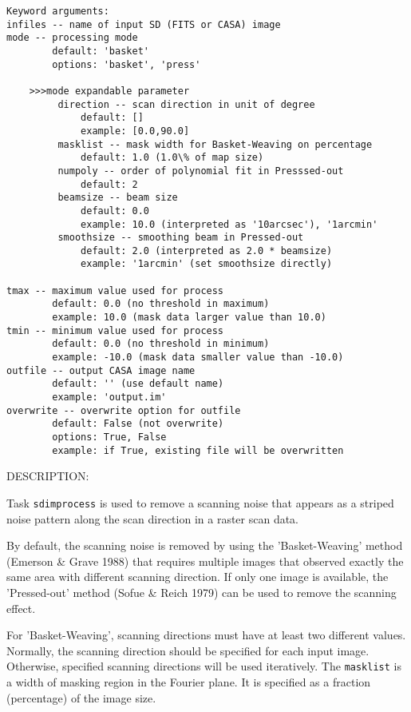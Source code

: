 \begin{verbatim}
Keyword arguments:
infiles -- name of input SD (FITS or CASA) image
mode -- processing mode
        default: 'basket'
        options: 'basket', 'press'

    >>>mode expandable parameter
         direction -- scan direction in unit of degree
             default: []
             example: [0.0,90.0]
         masklist -- mask width for Basket-Weaving on percentage
             default: 1.0 (1.0\% of map size)
         numpoly -- order of polynomial fit in Presssed-out
             default: 2
         beamsize -- beam size 
             default: 0.0
             example: 10.0 (interpreted as '10arcsec'), '1arcmin'
         smoothsize -- smoothing beam in Pressed-out
             default: 2.0 (interpreted as 2.0 * beamsize)
             example: '1arcmin' (set smoothsize directly)

tmax -- maximum value used for process
        default: 0.0 (no threshold in maximum)
        example: 10.0 (mask data larger value than 10.0)
tmin -- minimum value used for process
        default: 0.0 (no threshold in minimum)
        example: -10.0 (mask data smaller value than -10.0)
outfile -- output CASA image name
        default: '' (use default name)
        example: 'output.im'
overwrite -- overwrite option for outfile
        default: False (not overwrite)
        options: True, False
        example: if True, existing file will be overwritten
\end{verbatim}

 DESCRIPTION:

Task {\tt sdimprocess} is used to remove a scanning noise that appears 
as a striped noise pattern along the scan direction in a raster 
scan data. 

By default, the scanning noise is removed by using the 
'Basket-Weaving' method (Emerson \& Grave 1988) that requires 
multiple images that observed exactly the same area with different 
scanning direction. If only one image is available, the 'Pressed-out' 
method (Sofue \& Reich 1979) can be used to remove the scanning effect.

For 'Basket-Weaving', scanning directions must have at least two 
different values. Normally, the scanning direction should be 
specified for each input image. Otherwise, specified scanning 
directions will be used iteratively. The {\tt masklist} is a width of 
masking region in the Fourier plane. It is specified as a fraction 
(percentage) of the image size. 

